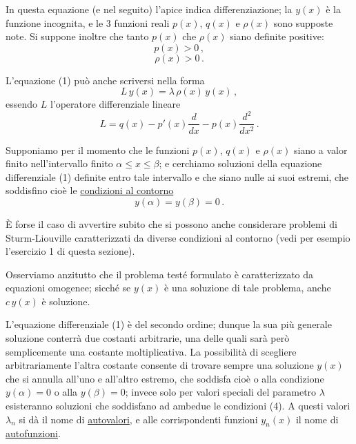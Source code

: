 \documentclass[11pt, a4paper]{book}
\numberwithin{equation}{section}
\begin{document}
In questa equazione (e nel seguito) l'apice indica differenziazione; la $y(x)$ è la funzione incognita, e le 3 funzioni reali $p(x)$, $q(x)$ e $\rho(x)$ sono supposte note. Si suppone inoltre che tanto $p(x)$ che $\rho(x)$ siano definite positive:
\begin{equation}
p(x)>0\,, \tag{2a}
\end{equation}
\begin{equation}
\rho(x)>0\,. \tag{2b}
\end{equation}

L'equazione (1) può anche scriversi nella forma
\begin{equation}
L\,y(x)=\lambda\,\rho(x)\,y(x)\,, \tag{1b}
\end{equation}
essendo $L$ l'operatore differenziale lineare
\begin{equation}
L = q(x) - p'(x)\frac{d}{dx} - p(x)\frac{d^2}{dx^2}\,. \tag{3}
\end{equation}

Supponiamo per il momento che le funzioni $p(x)$, $q(x)$ e $\rho(x)$ siano a valor finito nell'intervallo finito $\alpha\leq x\leq\beta$; e cerchiamo soluzioni della equazione differenziale (1) definite entro tale intervallo e che siano nulle ai suoi estremi, che soddisfino cioè le \underline{condizioni al contorno}
\begin{equation}
y(\alpha)=y(\beta)=0\,. \tag{4}
\end{equation}

È forse il caso di avvertire subito che si possono anche considerare problemi di Sturm-Liouville caratterizzati da diverse condizioni al contorno (vedi per esempio l'esercizio 1 di questa sezione).

Osserviamo anzitutto che il problema testé formulato è caratterizzato da equazioni omogenee; sicché se $y(x)$ è una soluzione di tale problema, anche $c\,y(x)$ è soluzione.

L'equazione differenziale (1) è del secondo ordine; dunque la sua più generale soluzione conterrà due costanti arbitrarie, una delle quali sarà però semplicemente una costante moltiplicativa. La possibilità di scegliere arbitrariamente l'altra costante consente di trovare sempre una soluzione $y(x)$ che si annulla all'uno e all'altro estremo, che soddisfa cioè o alla condizione $y(\alpha)=0$ o alla $y(\beta)=0$; invece solo per valori speciali del parametro $\lambda$ esisteranno soluzioni che soddisfano ad ambedue le condizioni (4). A questi valori $\lambda_n$ si dà il nome di \underline{autovalori}, e alle corrispondenti funzioni $y_n(x)$ il nome di \underline{autofunzioni}.
\end{document}

